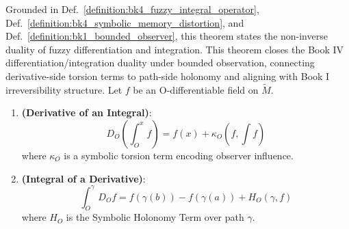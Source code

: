 \begin{theorem}
\label{theorem:bk4_fuzzy_fundamental}
Grounded in Def.~\ref{definition:bk4_fuzzy_integral_operator}, Def.~\ref{definition:bk4_symbolic_memory_distortion}, and Def.~\ref{definition:bk1_bounded_observer}, this theorem states the non-inverse duality of fuzzy differentiation and integration.
This theorem closes the Book IV differentiation/integration duality under bounded observation, connecting derivative-side torsion terms to path-side holonomy and aligning with Book I irreversibility structure.
Let $f$ be an O-differentiable field on $\tilde{M}$.
\begin{enumerate}
    \item \textbf{(Derivative of an Integral)}:
    \[
    D_O \left( \int_O^x f \right) = f(x) + \kappa_O\left(f, \int f\right)
    \]
    where $\kappa_O$ is a symbolic torsion term encoding observer influence.
    
    \item \textbf{(Integral of a Derivative)}:
    \[
    \int_O^\gamma D_O f = f(\gamma(b)) - f(\gamma(a)) + H_O(\gamma, f)
    \]
    where $H_O$ is the Symbolic Holonomy Term over path $\gamma$.
\end{enumerate}
\end{theorem}

